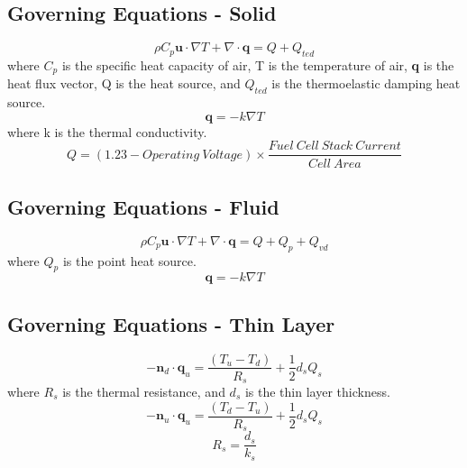     \subsection{Governing Equations - Solid}
        \begin{equation}
            \rho C_{p} \textbf{u} \cdot \nabla T + \nabla \cdot \textbf{q} = Q + Q_{ted}
        \end{equation}
            \noindent where \(C_{p}\) is the specific heat capacity of air, T is the temperature of air, \textbf{q} is the heat flux vector, Q is the heat source, and \(Q_{ted}\) is the thermoelastic damping heat source.
        \begin{equation}
            \textbf{q} = -k \nabla T
        \end{equation}
            \noindent where k is the thermal conductivity. 
        \begin{equation}
            Q = (1.23 - Operating\ Voltage) \times \frac{Fuel\ Cell\ Stack\ Current}{Cell\ Area}
        \end{equation}
            
    \subsection{Governing Equations - Fluid}
        \begin{equation}
            \rho C_{p} \textbf{u} \cdot \nabla T + \nabla \cdot \textbf{q} = Q + Q_{p} + Q_{vd} %
        \end{equation}
        \noindent where \(Q_{p}\) is the point heat source.
        \begin{equation}
            \textbf{q} = -k \nabla T
        \end{equation}
    
    \subsection{Governing Equations - Thin Layer}
        \begin{equation}
            -\textbf{n}_{d} \cdot \textbf{q}_{u} = \frac{(T_{u} - T_{d})}{R_{s}} + \frac{1}{2} d_{s} Q_{s}
        \end{equation}
        \noindent where \(R_s\) is the thermal resistance, and \(d_s\) is the thin layer thickness. 
        \begin{equation}
            -\textbf{n}_{u} \cdot \textbf{q}_{u} = \frac{(T_{d} - T_{u})}{R_{s}} + \frac{1}{2} d_{s} Q_{s}
        \end{equation}
        \begin{equation}
            R_{s} = \frac{d_{s}}{k_{s}}
        \end{equation}
    
